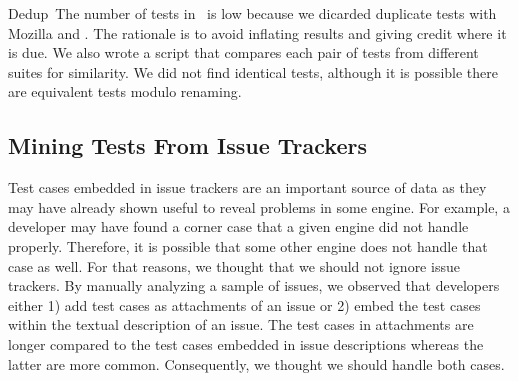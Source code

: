 \documentclass[smallextended]{svjour3}
\begin{document}

\lbrack{}Dedup\rbrack{}~The number of tests in \veight\ is low because
we dicarded duplicate tests with Mozilla and \jsc. The rationale is to
avoid inflating results and giving credit where it is due. We also
wrote a script that compares each pair of tests from different suites
for similarity. We did not find identical tests, although it is
possible there are equivalent tests modulo renaming.


\subsection{Mining Tests From Issue Trackers}







Test cases embedded in issue trackers are an important source of data
as they may have already shown useful to reveal problems in some
engine. For example, a developer may have found a corner case that a
given engine did not handle properly. Therefore, it is possible that
some other engine does not handle that case as well. For that reasons,
we thought that we should not ignore issue trackers. By manually
analyzing a sample of issues, we observed that developers either 1)
add test cases as attachments of an issue or 2) embed the test cases
within the textual description of an issue. The test cases in
attachments are longer compared to the test cases embedded in issue
descriptions whereas the latter are more common. Consequently, we
thought we should handle both cases.
\end{document}
